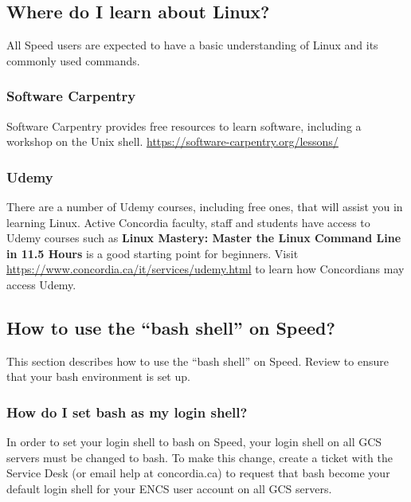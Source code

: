 \documentclass{easychair}
\begin{document}
\subsection{Where do I learn about Linux?}

All Speed users are expected to have a basic understanding of Linux and its commonly used commands.

\subsubsection*{Software Carpentry}

Software Carpentry provides free resources to learn software, including a workshop on the Unix shell.
\url{https://software-carpentry.org/lessons/} 

\subsubsection*{Udemy}

There are a number of Udemy courses, including free ones, that will assist 
you in learning Linux. Active Concordia faculty, staff and students have 
access to Udemy courses such as \textbf{Linux Mastery: Master the Linux 
Command Line in 11.5 Hours} is a good starting point for beginners. Visit
\url{https://www.concordia.ca/it/services/udemy.html} to learn how Concordians 
may access Udemy.

\subsection{How to use the ``bash shell'' on Speed?}

This section describes how to use the ``bash shell'' on Speed. Review
 to ensure that your bash environment is set up.

\subsubsection{How do I set bash as my login shell?}

In order to set your login shell to bash on Speed, your login shell on all GCS servers must be changed to bash.
To make this change, create a ticket with the Service Desk (or email help at concordia.ca) to request that bash become your default login shell for your ENCS user account on all GCS servers.
\end{document}

